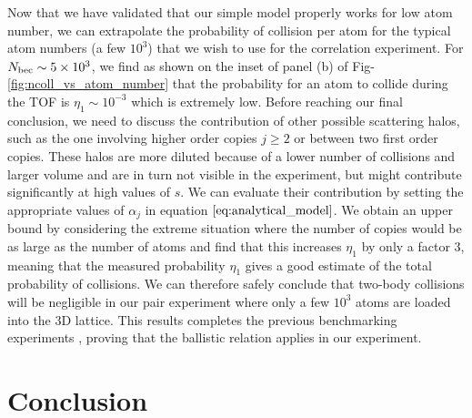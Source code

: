 Now that we have validated that our simple model properly works for low atom number, we can extrapolate the probability of collision per atom for the typical atom numbers (a few $10^3$) that we wish to use for the \kmk correlation experiment. For $N_{\rm{bec}} \sim 5 \times 10^3$, we find as shown on the inset of panel (b) of Fig-\ref{fig:ncoll_vs_atom_number} that the probability for an atom to collide during the TOF is $\eta_1 \sim 10^{-3}$ which is extremely low. Before reaching our final conclusion, we need to discuss the contribution of other possible scattering halos, such as the one involving higher order copies $j \geq 2$ or between two first order copies. These halos are more diluted because of a lower number of collisions and larger volume and are in turn not visible in the experiment, but might contribute significantly at high values of $s$. We can evaluate their contribution by setting the appropriate values of $\alpha_j$ in equation $\ref{eq:analytical_model}$. We obtain an upper bound by considering the extreme situation where the number of copies would be as large as the number of atoms and find that this increases $\eta_1$ by only a factor 3, meaning that the measured probability $\eta_1$ gives a good estimate of the total probability of collisions. We can therefore safely conclude that two-body collisions will be negligible in our \kmk pair experiment where only a few $10^3$ atoms are loaded into the 3D lattice. This results completes the previous benchmarking experiments \cite{cayla2018single}, proving that the ballistic relation applies in our experiment.

\section{Conclusion}

